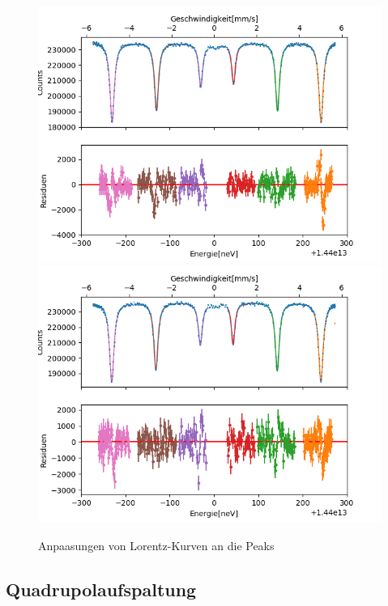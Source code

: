 \documentclass[12pt,a4paper]{article}
\begin{document}
\begin{figure}[H]
\centering
\includegraphics[scale=0.9]{Bilder/Hyperfein/Hyper_fit_vor.png}
\includegraphics[scale=0.9]{Bilder/Hyperfein/Hyper_fit_nach.png}
\caption{Anpaasungen von Lorentz-Kurven an die Peaks}
\label{fig:Hyper_fit}
\end{figure}

\subsection{Quadrupolaufspaltung}
\end{document}
